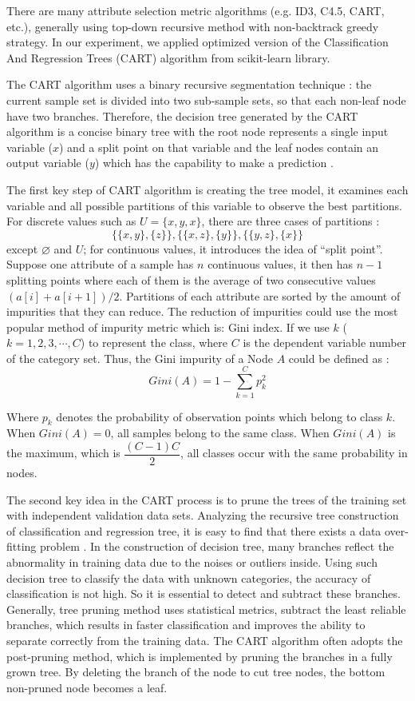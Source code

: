 \documentclass[sigconf]{acmart}
\begin{document}
There are many attribute selection metric algorithms (e.g. ID3, C4.5, CART, etc.), generally using top-down recursive method with non-backtrack greedy strategy. In our experiment, we applied optimized version of the Classification And Regression Trees (CART) algorithm from scikit-learn library.

The CART algorithm uses a binary recursive segmentation technique \cite{cart}: the current sample set is divided into two sub-sample sets, so that each non-leaf node have two branches. Therefore, the decision tree generated by the CART algorithm is a concise binary tree with the root node represents a single input variable ($x$) and a split point on that variable and the leaf nodes contain an output variable ($y$) which has the capability to make a prediction \cite{cart}.

The first key step of CART algorithm is creating the tree model, it examines each variable and all possible partitions of this variable to observe the best partitions. For discrete values such as $U=\{x, y, x\}$, there are three cases of partitions \cite{sklearn.dt}:
\[
    \{\{x,y\},\{z\}\},\{\{x,z\},\{y\}\}, \{\{y,z\},\{x\}\}
\]
except $\varnothing$ and $U$; for continuous values, it introduces the idea of ``split point''. Suppose one attribute of a sample has $n$ continuous values, it then has $n-1$ splitting points where each of them is the average of two consecutive values $(a[i]+a[i+1])/2$. Partitions of each attribute are sorted by the amount of impurities that they can reduce. The reduction of impurities could use the most popular method of impurity metric which is: Gini index. If we use $k$ ($k= 1,2,3,\cdots, C$) to represent the class, where $C$ is the dependent variable number of the category set. Thus, the Gini impurity of a Node $A$ could be defined as \cite{sklearn.dt}:
\[
    Gini(A)=1-\sum_{k=1}^{C} p_{k}^2
\]

Where $p_{k}$ denotes the probability of observation points which belong to class $k$. When $Gini(A)=0$, all samples belong to the same class. When $Gini(A)$ is the maximum, which is $\dfrac{(C-1)C}{2}$, all classes occur with the same probability in nodes.

The second key idea in the CART process is to prune the trees of the training set with independent validation data sets. Analyzing the recursive tree construction of classification and regression tree, it is easy to find that there exists a data over-fitting problem \cite{cart}. In the construction of decision tree, many branches reflect the abnormality in training data due to the noises or outliers inside. Using such decision tree to classify the data with unknown categories, the accuracy of classification is not high. So it is essential to detect and subtract these branches. Generally, tree pruning method uses statistical metrics, subtract the least reliable branches, which results in faster classification and improves the ability to separate correctly from the training data. The CART algorithm often adopts the post-pruning method, which is implemented by pruning the branches in a fully grown tree. By deleting the branch of the node to cut tree nodes, the bottom non-pruned node becomes a leaf.
\end{document}
